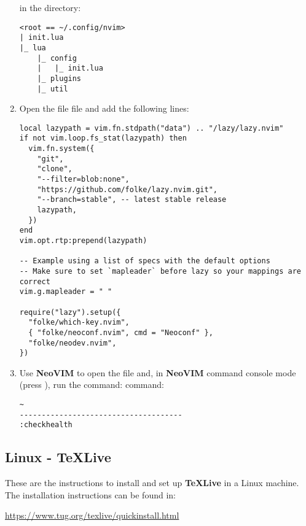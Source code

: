 \begin{enumerate}
     in the  directory:
    \begin{verbatim}
<root == ~/.config/nvim>
| init.lua
|_ lua
    |_ config
    |   |_ init.lua
    |_ plugins
    |_ util
    \end{verbatim}
    \item Open the file  file and add the following
    lines:
    \begin{verbatim}
local lazypath = vim.fn.stdpath("data") .. "/lazy/lazy.nvim"
if not vim.loop.fs_stat(lazypath) then
  vim.fn.system({
    "git",
    "clone",
    "--filter=blob:none",
    "https://github.com/folke/lazy.nvim.git",
    "--branch=stable", -- latest stable release
    lazypath,
  })
end
vim.opt.rtp:prepend(lazypath)

-- Example using a list of specs with the default options
-- Make sure to set `mapleader` before lazy so your mappings are correct
vim.g.mapleader = " "

require("lazy").setup({
  "folke/which-key.nvim",
  { "folke/neoconf.nvim", cmd = "Neoconf" },
  "folke/neodev.nvim",
})
    \end{verbatim}
    \item Use \textbf{NeoVIM} to open the file and, in \textbf{NeoVIM} command
    console mode (press ), run the command:
    command:
    \begin{verbatim}
~
-------------------------------------
:checkhealth
    \end{verbatim}
\end{enumerate}


\subsection{Linux - TeXLive}

These are the instructions to install and set up \textbf{TeXLive} in a Linux machine. The
installation instructions can be found in:
\begin{center}
    \url{https://www.tug.org/texlive/quickinstall.html}
\end{center}


